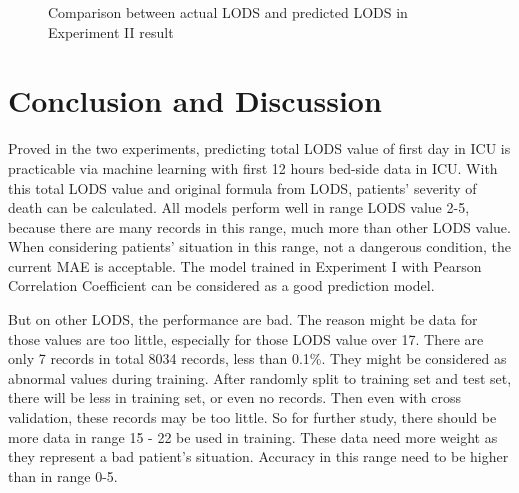 \documentclass[12pt,a4paper,english
]{tunithesis}
\begin{document}
\begin{figure}
  \begin{center}
    \qquad                        
    \caption[Actual value \& Predicted value]{Comparison between actual LODS and predicted LODS in Experiment II result}

    \label{fig:experiment_2_result}
  \end{center}
\end{figure}


\chapter{Conclusion and Discussion}
\label{ch:conclusion}
Proved in the two experiments, predicting total LODS value of first day in ICU is practicable via machine learning with first 12 hours bed-side data in ICU. With this total LODS value and original formula from LODS, patients' severity of death can be calculated. All models perform well in range LODS value 2-5, because there are many records in this range, much more than other LODS value. When considering patients' situation in this range, not a dangerous condition, the current MAE is acceptable. The model trained in Experiment I with Pearson Correlation Coefficient can be considered as a good prediction model.

But on other LODS, the performance are bad. The reason might be data for those values are too little, especially for those LODS value over 17. There are only 7 records in total 8034 records, less than 0.1\%. They might be considered as abnormal values during training. After randomly split to training set and test set, there will be less in training set, or even no records. Then even with cross validation, these records may be too little. So for further study, there should be more data in range 15 - 22 be used in training. These data need more weight as they represent a bad patient's situation. Accuracy in this range need to be higher than in range 0-5.
\end{document}
